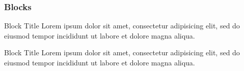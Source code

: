 \begin{frame}\frametitle{Blocks}

\begin{block}{Block Title}
Lorem ipsum dolor sit amet, consectetur adipisicing elit, sed do eiusmod tempor incididunt ut labore et dolore magna aliqua.
\end{block}

\begin{alertblock}{Block Title}
Lorem ipsum dolor sit amet, consectetur adipisicing elit, sed do eiusmod tempor incididunt ut labore et dolore magna aliqua.
\end{alertblock}

\end{frame}